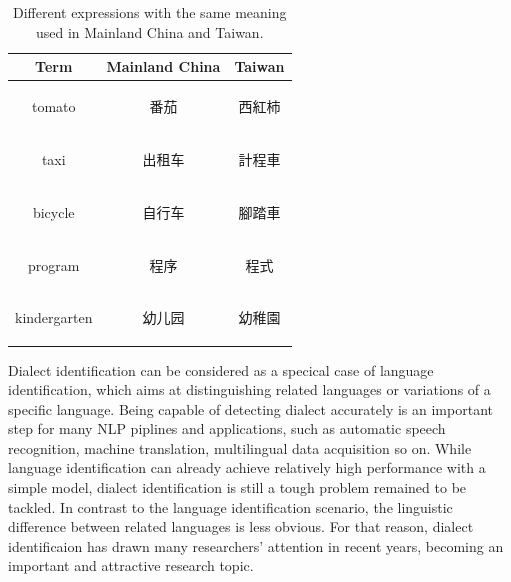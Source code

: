 \documentclass[11pt,a4paper]{article}
\begin{document}
\begin{table}[t!]
\begin{center}
\begin{tabular}{|c|c|c|}
\hline \bf Term & \bf Mainland China & \bf Taiwan \\ \hline
tomato & \begin{CJK}{UTF8}{gbsn}番茄\end{CJK} &  \begin{CJK}{UTF8}{gbsn}西紅柿\end{CJK}  \\ \hline
taxi & \begin{CJK}{UTF8}{gbsn}出租车\end{CJK}  &  \begin{CJK}{UTF8}{gbsn}計程車\end{CJK} \\ \hline
bicycle &   \begin{CJK}{UTF8}{gbsn}自行车\end{CJK} & \begin{CJK}{UTF8}{gbsn}腳踏車\end{CJK} \\ \hline
program &  \begin{CJK}{UTF8}{gbsn}程序\end{CJK} & \begin{CJK}{UTF8}{gbsn}程式\end{CJK} \\ \hline
kindergarten &  \begin{CJK}{UTF8}{gbsn}幼儿园\end{CJK} & \begin{CJK}{UTF8}{gbsn}幼稚園\end{CJK} \\
\hline
\end{tabular}
\end{center}

Dialect identification can be considered as a specical case of language identification, which aims at distinguishing  related languages or variations of a specific language. Being capable of detecting dialect accurately is an important step for many NLP piplines and applications, such as automatic speech recognition, machine translation, multilingual data acquisition so on. While language identification can already achieve relatively high performance with a simple model, dialect identification is still a tough problem remained to be tackled. In contrast to the language identification scenario, the linguistic difference between related languages is less obvious. For that reason, dialect identificaion has drawn many researchers' attention in recent years, becoming an important and attractive research topic.

\caption{\label{vocab differ} Different expressions with the same meaning used in Mainland China and Taiwan. }
\end{table}
\end{document}
